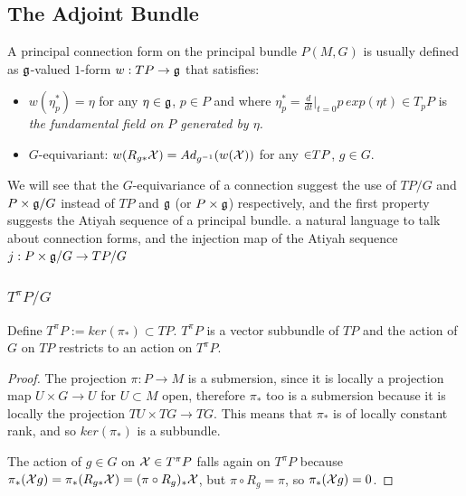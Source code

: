 \subsection{The Adjoint Bundle}
A principal connection form on the principal bundle $P(M, G)$ is usually defined as $\mathfrak{g}$-valued $1$-form  $w: TP \to \mathfrak{g}$ that satisfies:

    \begin{itemize}
    
    \item $w(\eta_p^*) = \eta$ for any $\eta \in \mathfrak{g}$, $p \in P$ and where $\eta_p^* = \frac{d}{dt}\bigr|_{t = 0} p\,exp(\eta t)\in T_p P$ is \emph{the fundamental field on $P$ generated by $\eta$.}
    
    \item $G$-equivariant: $w(R_{g*} \mathcal{X}) = Ad_{g^{-1}}( w(\mathcal{X}))$ for any $\mathcal{\in} TP$, $g \in G$.
    
    \end{itemize}

We will see that the $G$-equivariance of a connection suggest the use of $TP/G$ and $P \times \mathfrak{g} / G$ instead of $TP$ and $\mathfrak{g}$ (or $P \times \mathfrak{g}$) respectively, and the first property suggests the Atiyah sequence of a principal bundle. a natural language to talk about connection forms, and the injection map of the Atiyah sequence $j: P \times \mathfrak{g}/G \to TP/G$%

\subsubsection{$T^\pi P/G$} %

\begin{lemma}
Define $T^\pi P := ker(\pi_*) \subset TP$. $T^\pi P$ is a vector subbundle of $TP$ and the action of $G$ on $TP$ restricts to an action on $T^\pi P$.
\end{lemma}

\begin{proof}
The projection $\pi:P \to M$ is a submersion, since it is locally a projection map $U \times G \to U$ for $U \subset M$ open, therefore $\pi_*$ too is a submersion because it is locally the projection $TU \times TG \to TG$. This means that $\pi_*$ is of locally constant rank, and so $ker(\pi_*)$ is a subbundle.

The action of $g \in G$ on $\mathcal{X} \in T^\pi P$ falls again on $T^\pi P$ because $\pi_*(\mathcal{X}g) = \pi_*(R_{g*} \mathcal{X}) = (\pi \circ R_g)_* \mathcal{X}$, but $\pi \circ R_g = \pi$, so $\pi_*(\mathcal{X}g) = 0$.
\end{proof}


